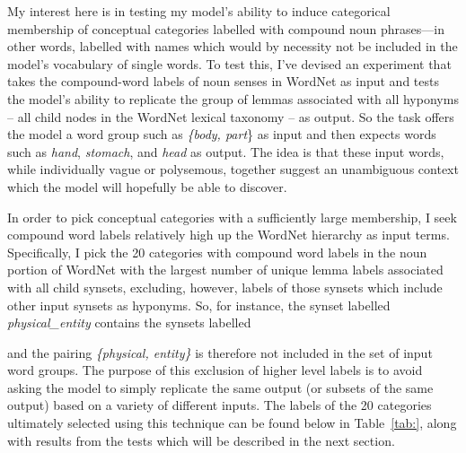 My interest here is in testing my model's ability to induce categorical membership of conceptual categories labelled with compound noun phrases---in other words, labelled with names which would by necessity not be included in the model's vocabulary of single words.  To test this, I've devised an experiment that takes the compound-word labels of noun senses in WordNet as input and tests the model's ability to replicate the group of lemmas associated with all hyponyms -- all child nodes in the WordNet lexical taxonomy -- as output.  So the task offers the model a word group such as \emph{\{body, part}\} as input and then expects words such as \emph{hand}, \emph{stomach}, and \emph{head} as output.  The idea is that these input words, while individually vague or polysemous, together suggest an unambiguous context which the model will hopefully be able to discover.

In order to pick conceptual categories with a sufficiently large membership, I seek compound word labels relatively high up the WordNet hierarchy as input terms.  Specifically, I pick the 20 categories with compound word labels in the noun portion of WordNet with the largest number of unique lemma labels associated with all child synsets, excluding, however, labels of those synsets which include other input synsets as hyponyms.  So, for instance, the synset labelled \emph{physical_entity} contains the synsets labelled

and the pairing \emph{\{physical, entity\}} is therefore not included in the set of input word groups.  The purpose of this exclusion of higher level labels is to avoid asking the model to simply replicate the same output (or subsets of the same output) based on a variety of different inputs.  The labels of the 20 categories ultimately selected using this technique can be found below in Table~\ref{tab:}, along with results from the tests which will be described in the next section.

